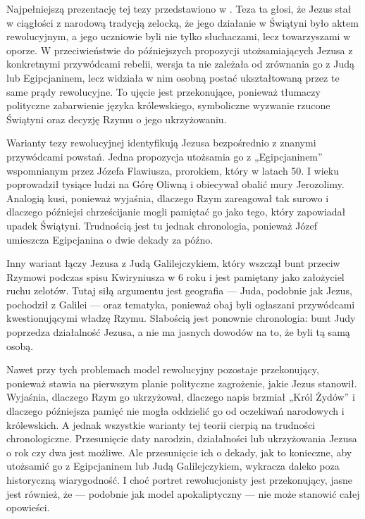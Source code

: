 Najpełniejszą prezentację tej tezy przedstawiono w \cite{brandon:zealots,brandon:fall}.
Teza ta głosi, że Jezus stał w ciągłości z narodową tradycją zelocką, że jego działanie w Świątyni było aktem rewolucyjnym, a jego uczniowie byli nie tylko słuchaczami, lecz towarzyszami w oporze.
W przeciwieństwie do późniejszych propozycji utożsamiających Jezusa z konkretnymi przywódcami rebelii, wersja ta nie zależała od zrównania go z Judą lub Egipcjaninem, lecz widziała w nim osobną postać ukształtowaną przez te same prądy rewolucyjne.
To ujęcie jest przekonujące, ponieważ tłumaczy polityczne zabarwienie języka królewskiego, symboliczne wyzwanie rzucone Świątyni oraz decyzję Rzymu o jego ukrzyżowaniu.

Warianty tezy rewolucyjnej identyfikują Jezusa bezpośrednio z znanymi przywódcami powstań.
Jedna propozycja utożsamia go z „Egipcjaninem” wspomnianym przez Józefa Flawiusza, prorokiem, który w latach 50. I wieku poprowadził tysiące ludzi na Górę Oliwną i obiecywał obalić mury Jerozolimy.
Analogią kusi, ponieważ wyjaśnia, dlaczego Rzym zareagował tak surowo i dlaczego późniejsi chrześcijanie mogli pamiętać go jako tego, który zapowiadał upadek Świątyni.
Trudnością jest tu jednak chronologia, ponieważ Józef umieszcza Egipcjanina o dwie dekady za późno.

Inny wariant łączy Jezusa z Judą Galilejczykiem, który wszczął bunt przeciw Rzymowi podczas spisu Kwiryniusza w 6 roku i jest pamiętany jako założyciel ruchu zelotów.
Tutaj siłą argumentu jest geografia — Juda, podobnie jak Jezus, pochodził z Galilei — oraz tematyka, ponieważ obaj byli ogłaszani przywódcami kwestionującymi władzę Rzymu.
Słabością jest ponownie chronologia: bunt Judy poprzedza działalność Jezusa, a nie ma jasnych dowodów na to, że byli tą samą osobą.

Nawet przy tych problemach model rewolucyjny pozostaje przekonujący, ponieważ stawia na pierwszym planie polityczne zagrożenie, jakie Jezus stanowił.
Wyjaśnia, dlaczego Rzym go ukrzyżował, dlaczego napis brzmiał „Król Żydów” i dlaczego późniejsza pamięć nie mogła oddzielić go od oczekiwań narodowych i królewskich.
A jednak wszystkie warianty tej teorii cierpią na trudności chronologiczne.
Przesunięcie daty narodzin, działalności lub ukrzyżowania Jezusa o rok czy dwa jest możliwe.
Ale przesunięcie ich o dekady, jak to konieczne, aby utożsamić go z Egipcjaninem lub Judą Galilejczykiem, wykracza daleko poza historyczną wiarygodność.
I choć portret rewolucjonisty jest przekonujący, jasne jest również, że — podobnie jak model apokaliptyczny — nie może stanowić całej opowieści.

